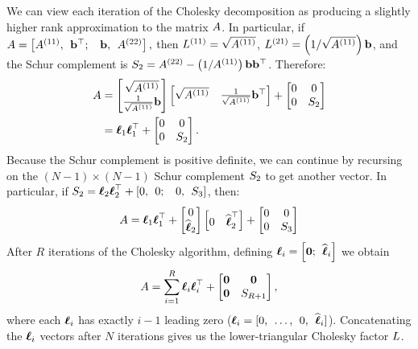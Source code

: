 We can view each iteration of the Cholesky decomposition as producing a slightly higher rank approximation to the matrix $A$.
In particular, if  $ A = \left[ A^{(11)}, \:\: \mathbf{b}^{\top}; \:\:\:\: \mathbf{b}, \:\: A^{(22)} \right], $
then $L^{(11)} = \sqrt{A^{(11)}}$, $L^{(21)} = \left( 1 / \sqrt{A^{(11)}} \right) \mathbf{b}$, and the Schur complement is $S_2 = A^{(22)} - \left(1/ A^{(11)} \right) \mathbf{b} \mathbf{b}^{\top}$.
Therefore:
%
\begin{align}
  A &=
    \begin{bmatrix} \sqrt{ A^{(11)} } \\ \frac{1}{\sqrt{A^{(11)}}} \mathbf{b} \end{bmatrix}
    \begin{bmatrix} \sqrt{ A^{(11)} } & \frac{1}{\sqrt{A^{(11)}}} \mathbf{b}^\top \end{bmatrix}
    +
    \begin{bmatrix} 0 & 0 \\ 0 & S_2 \end{bmatrix}
  \nonumber \\
  &= \boldsymbol{\ell}_{1}\boldsymbol{\ell}_{1}^{\top} + \begin{bmatrix} 0 & 0 \\ 0 & S_2 \end{bmatrix}
  \label{eqn:chol_incomplete}.
\end{align}
%
Because the Schur complement is positive definite, we can continue by recursing on the $(N-1) \times (N - 1)$ Schur complement $S_2$ to get another vector.
In particular, if $S_2 = \boldsymbol{\ell}_{2}\boldsymbol{\ell}_{2}^{\top} + \left[0, \:\: 0; \:\:\:\: 0, \:\: S_3 \right]$, then:
%
\begin{align*}
  A  = \boldsymbol{\ell}_{1}\boldsymbol{\ell}_{1}^{\top} + \begin{bmatrix} 0 \\ \widehat {\boldsymbol{\ell}}_{2} \end{bmatrix} \begin{bmatrix} 0 & \widehat {\boldsymbol{\ell}}_2^\top \end{bmatrix} +
  \begin{bmatrix} 0 & 0 \\ 0 & S_3 \end{bmatrix}
\end{align*}
%
After $R$ iterations of the Cholesky algorithm, defining $\boldsymbol{\ell}_{i} = \left[ \mathbf{0}; \:\: \widehat {\boldsymbol{\ell}}_i \right]$ we obtain
%
\begin{align}
  A  = \sum_{i=1}^{R} {\boldsymbol{\ell}}_{i} {\boldsymbol{\ell}}_{i}^{\top} + \begin{bmatrix} \mathbf{0} & \mathbf{0} \\ \mathbf{0} & S_{R+1} \end{bmatrix},
  \label{eqn:chol_low_rank}
\end{align}
%
where each $\boldsymbol{\ell}_i$ has exactly $i-1$ leading zero ($\boldsymbol{\ell}_i = [0, \:\: \ldots, \:\: 0, \:\: \widehat {\boldsymbol{\ell}}_i]$).
Concatenating the $\boldsymbol{\ell}_i$ vectors after $N$ iterations gives us the lower-triangular Cholesky factor $L$.

